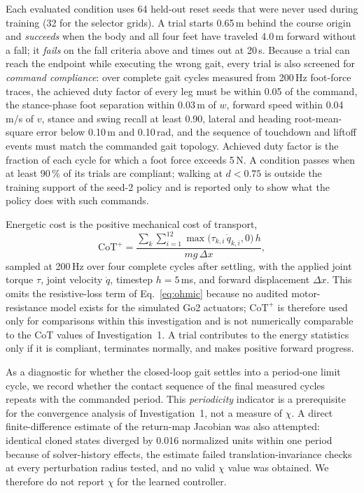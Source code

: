 Each evaluated condition uses 64 held-out reset seeds that were never used
during training (32 for the selector grids). A trial starts 0.65\,m behind the
course origin and \emph{succeeds} when the body and all four feet have
traveled 4.0\,m forward without a fall; it \emph{fails} on the fall criteria
above and times out at 20\,s. Because a trial can reach the endpoint while
executing the wrong gait, every trial is also screened for \emph{command
compliance}: over complete gait cycles measured from 200\,Hz foot-force traces,
the achieved duty factor of every leg must be within 0.05 of the command, the
stance-phase foot separation within 0.03\,m of $w$, forward speed within
0.04\,m/s of $v$, stance and swing recall at least 0.90, lateral and heading
root-mean-square error below 0.10\,m and 0.10\,rad, and the sequence of
touchdown and liftoff events must match the commanded gait topology.
Achieved duty factor is the fraction of each cycle for which a foot force
exceeds 5\,N. A condition passes when at least 90\,\% of its trials are
compliant; walking at $d<0.75$ is outside the training support of the seed-2
policy and is reported only to show what the policy does with such commands.

Energetic cost is the positive mechanical cost of transport,
\begin{equation}
\mathrm{CoT}^{+} = \frac{\sum_{k}\sum_{i=1}^{12}\max\!\big(\tau_{k,i}\,\dot q_{k,i},0\big)\,h}{m g \,\Delta x},
\label{eq:inv3_cot}
\end{equation}
sampled at 200\,Hz over four complete cycles after settling, with the applied
joint torque $\tau$, joint velocity $\dot q$, timestep $h=5$\,ms, and forward
displacement $\Delta x$. This omits the resistive-loss term of
Eq.~\eqref{eq:ohmic} because no audited motor-resistance model exists for the
simulated Go2 actuators; $\mathrm{CoT}^{+}$ is therefore used only for
comparisons within this investigation and is not numerically comparable to
the CoT values of Investigation~1. A trial contributes to the energy statistics
only if it is compliant, terminates normally, and makes positive forward
progress.

As a diagnostic for whether the closed-loop gait settles into a period-one
limit cycle, we record whether the contact sequence of the final measured
cycles repeats with the commanded period. This \emph{periodicity} indicator
is a prerequisite for the convergence analysis of Investigation~1, not a
measure of $\chi$. A direct finite-difference estimate of the return-map
Jacobian was also attempted: identical cloned states diverged by 0.016
normalized units within one period because of solver-history effects, the
estimate failed translation-invariance checks at every perturbation radius
tested, and no valid $\chi$ value was obtained. We therefore do not report
$\chi$ for the learned controller.

